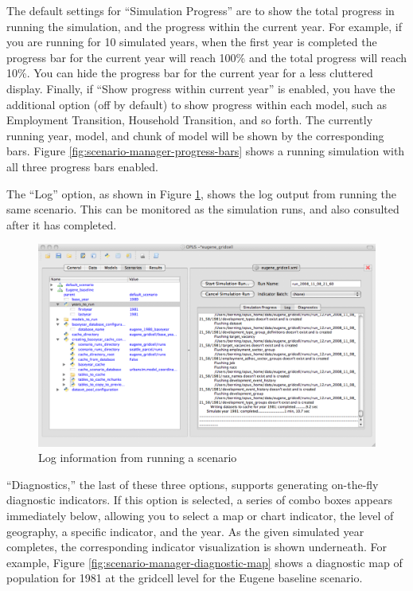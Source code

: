 The default settings for ``Simulation Progress'' are to show the total
progress in running the simulation, and the progress within the current
year.  For example, if you are running for 10 simulated years, when the
first year is completed the progress bar for the current year will reach
100\% and the total progress will reach 10\%.  You can hide the progress
bar for the current year for a less cluttered display.  Finally, if ``Show
progress within current year'' is enabled, you have the additional option
(off by default) to show progress within each model, such as Employment
Transition, Household Transition, and so forth. The currently running year,
model, and chunk of model will be shown by the corresponding bars.  Figure
\ref{fig:scenario-manager-progress-bars} shows a running simulation with all
three progress bars enabled.

The ``Log'' option, as shown in Figure
\ref{fig:scenario-manager-log-pane.png}, shows the log output from running
the same scenario.  This can be monitored as the simulation runs, and also
consulted after it has completed.

\begin{figure}[htp]
\begin{center}
\includegraphics[scale=0.4]{part-gui/images/scenario-manager-log-pane.png}
\end{center}
\caption{Log information from running a scenario}
\label{fig:scenario-manager-log-pane.png}
\end{figure}

``Diagnostics,'' the last of these three options, supports generating
on-the-fly diagnostic indicators.  If this option is selected, a series of
combo boxes appears immediately below, allowing you to select a map or
chart indicator, the level of geography, a specific indicator, and the
year.  As the given simulated year completes, the corresponding indicator
visualization is shown underneath.  For example, Figure
\ref{fig:scenario-manager-diagnostic-map} shows a diagnostic map of population
for 1981 at the gridcell level for the Eugene baseline scenario.

